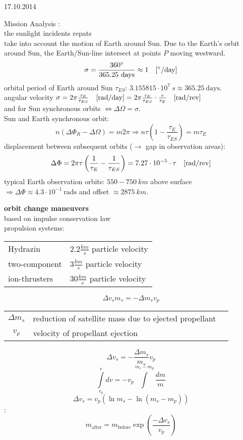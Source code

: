 \begin{chapter}{17.10.2014}
\begin{section}{Mission Analysis}
 \textbf{}: \\
 the sunlight incidents repats\\
 take into account the motion of Earth around Sun. Due to the Earth's orbit around Sun, the Earth/Sun-line intersect at points $P$ moving westward.
 \[ \sigma = \frac{360\degree}{365.25 ~\text{days}} \approx 1 ~~~[\degree/\text{day}]\]
 orbital period of Earth around Sun $\tau_{ES}$: $3.155815 \cdot 10^7 ~s \approx 365.25 ~\text{days}$.\\
 angular velocity $\sigma = 2 \pi \frac{\tau_E}{\tau_{ES}}~~~[\text{rad}/\text{day}] = 2\pi \frac{\tau_E}{\tau_{ES}}\cdot \frac{\tau}{\tau_E}~~~[\text{rad}/\text{rev}]$\\
 and for Sun synchronous orbits $\Leftrightarrow \Delta \Omega = \sigma$.\\
 Sun and Earth synchronous orbit:
 \[ n(\Delta\Phi_R - \Delta\Omega) = m2\pi \Rightarrow n\tau\left(1-\frac{\tau_E}{\tau_{ES}}\right) = m\tau_E \]
 displacement between subsequent orbits ($\rightarrow$ gap in observation areas): 
 \[ \Delta\Phi = 2\pi\tau\left(\frac{1}{\tau_E}-\frac{1}{\tau_{ES}}\right) = 7.27\cdot10^{-5}\cdot \tau~~~[\text{rad}/\text{rev}] \]
 typical Earth observation orbits: $550 - 750~km$ above surface $\Rightarrow \Delta\Phi \approx 4.3\cdot 10^{-1} ~\text{rads}$ and offset $\approx 2875~km$.
 
 \textbf{orbit change maneuvers}\\
 based on impulse conservation law\\
 propulsion systems:\\
 \begin{tabular}{l|l}
  Hydrazin & $2.2 \frac{km}{s}$ particle velocity \\
  two-component & $3 \frac{km}{s}$ particle velocity \\
  ion-thrusters & $30 \frac{km}{s}$ particle velocity 
 \end{tabular}
 
 \[\Delta v_s m_s = -\Delta m_s v_p\]
 \begin{tabular}{c|l|c}
  $\Delta m_s$ & reduction of satellite mass due to ejected propellant & \\
  $v_p$ & velocity of propellant ejection & \\
 \end{tabular}
 
 \[\Delta v_s = -\frac{\Delta m_s}{m_s}v_p\]
 \[\int\limits_{v_0}^v dv = -v_p \int\limits^{m_s-m_p} \frac{dm}{m}\]
 \[\Delta v_s = v_p (\ln m_s - \ln (m_s -m_p))\]
 \textbf{}:
 \[m_\text{after} = m_\text{before} \exp \left(\frac{-\Delta v_s}{v_p}\right)\]


 \end{section}
\end{chapter}